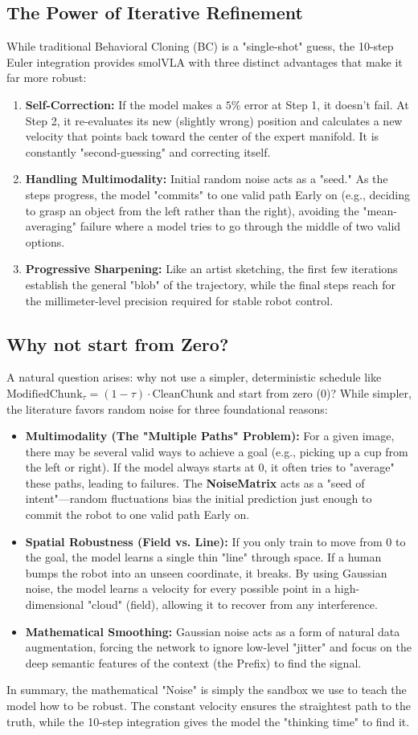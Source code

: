 \documentclass[11pt,a4paper]{article}
\begin{document}
\subsection{The Power of Iterative Refinement}
While traditional Behavioral Cloning (BC) is a "single-shot" guess, the 10-step Euler integration provides smolVLA with three distinct advantages that make it far more robust:
\begin{enumerate}
    \item \textbf{Self-Correction:} If the model makes a $5\%$ error at Step 1, it doesn't fail. At Step 2, it re-evaluates its new (slightly wrong) position and calculates a new velocity that points back toward the center of the expert manifold. It is constantly "second-guessing" and correcting itself.
    \item \textbf{Handling Multimodality:} Initial random noise acts as a "seed." As the steps progress, the model "commits" to one valid path Early on (e.g., deciding to grasp an object from the left rather than the right), avoiding the "mean-averaging" failure where a model tries to go through the middle of two valid options.
    \item \textbf{Progressive Sharpening:} Like an artist sketching, the first few iterations establish the general "blob" of the trajectory, while the final steps reach for the millimeter-level precision required for stable robot control.
\end{enumerate}

\subsection{Why not start from Zero?}
A natural question arises: why not use a simpler, deterministic schedule like $\text{ModifiedChunk}_\tau = (1-\tau) \cdot \text{CleanChunk}$ and start from zero ($0$)? While simpler, the literature favors random noise for three foundational reasons:
\begin{itemize}
    \item \textbf{Multimodality (The "Multiple Paths" Problem):} For a given image, there may be several valid ways to achieve a goal (e.g., picking up a cup from the left or right). If the model always starts at $0$, it often tries to "average" these paths, leading to failures. The \textbf{NoiseMatrix} acts as a "seed of intent"---random fluctuations bias the initial prediction just enough to commit the robot to one valid path Early on.
    \item \textbf{Spatial Robustness (Field vs. Line):} If you only train to move from $0$ to the goal, the model learns a single thin "line" through space. If a human bumps the robot into an unseen coordinate, it breaks. By using Gaussian noise, the model learns a velocity for every possible point in a high-dimensional "cloud" (field), allowing it to recover from any interference.
    \item \textbf{Mathematical Smoothing:} Gaussian noise acts as a form of natural data augmentation, forcing the network to ignore low-level "jitter" and focus on the deep semantic features of the context (the Prefix) to find the signal.
\end{itemize}

In summary, the mathematical "Noise" is simply the sandbox we use to teach the model how to be robust. The constant velocity ensures the straightest path to the truth, while the 10-step integration gives the model the "thinking time" to find it.
\end{document}
